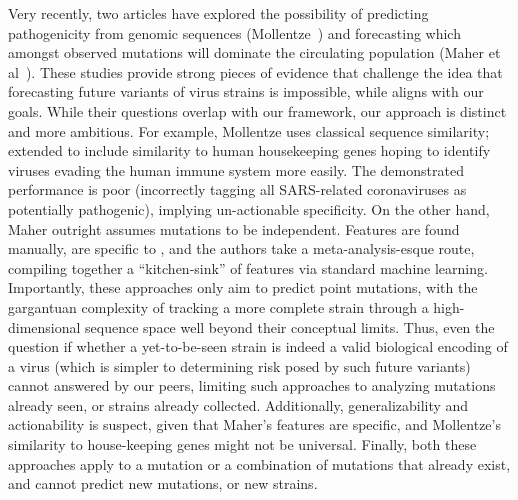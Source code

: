 \documentclass[onecolumn, compsoc,10pt]{IEEEtran}
\begin{document}
Very recently, two articles have explored the possibility of predicting  pathogenicity from genomic sequences (Mollentze~\cite{mollentze2021identifying}) and forecasting which amongst observed mutations will dominate the circulating population (Maher et al~\cite{maher2021predicting}). These studies provide strong pieces of evidence that challenge the idea that forecasting future variants of virus strains is impossible, while aligns with our goals. While their questions overlap with our framework, our approach is distinct and more ambitious. For example,  Mollentze  uses  classical  sequence similarity; extended to include similarity to  human housekeeping genes hoping to identify viruses  evading the human immune system more easily.  The demonstrated  performance is poor (incorrectly tagging all SARS-related coronaviruses as potentially pathogenic), implying un-actionable specificity. On the other hand,  Maher outright assumes mutations to be independent. Features are found manually,  are specific to \hcov, and the authors take  a meta-analysis-esque route, compiling together a ``kitchen-sink'' of features via standard machine learning. Importantly, these approaches  only aim to predict point mutations, with  the gargantuan complexity of tracking a more complete strain through a high-dimensional sequence space well beyond their conceptual limits. Thus, even the question if whether a yet-to-be-seen strain is indeed a valid biological encoding of a virus (which is simpler to determining risk posed by such future variants) cannot answered by our peers, limiting such approaches to analyzing mutations already seen, or strains  already collected.  Additionally, generalizability and actionability is  suspect, given that Maher's features are \hcov specific, and Mollentze's similarity to house-keeping genes might not be universal. Finally, both these  approaches apply to a mutation or a combination of mutations that already exist, and cannot predict new mutations, or new strains.
\end{document}
